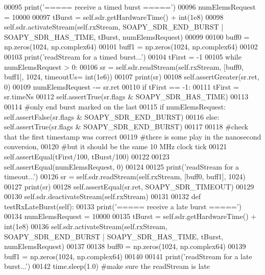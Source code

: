 \begin{DoxyCode}
{{{00095         print(\textcolor{stringliteral}{'===== receive a timed burst ====='})
00096         numElemsRequest = 10000
00097         tBurst = self.sdr.getHardwareTime() + int(1e8)
00098         self.sdr.activateStream(self.rxStream, SOAPY\_SDR\_END\_BURST | SOAPY\_SDR\_HAS\_TIME, tBurst, 
      numElemsRequest)
00099 
00100         buff0 = np.zeros(1024, np.complex64)
00101         buff1 = np.zeros(1024, np.complex64)
00102 
00103         print(\textcolor{stringliteral}{'readStream for a timed burst...'})
00104         tFirst = -1
00105         \textcolor{keywordflow}{while} numElemsRequest > 0:
00106             sr = self.sdr.readStream(self.rxStream, [buff0, buff1], 1024, timeoutUs=
      int(1e6))
00107             print(sr)
00108             self.assertGreater(sr.ret, 0)
00109             numElemsRequest -= sr.ret
00110             \textcolor{keywordflow}{if} tFirst == -1:
00111                 tFirst = sr.timeNs
00112                 self.assertTrue(sr.flags & SOAPY\_SDR\_HAS\_TIME)
00113 
00114             \textcolor{comment}{#only end burst marked on the last}
00115             \textcolor{keywordflow}{if} numElemsRequest: self.assertFalse(sr.flags & SOAPY\_SDR\_END\_BURST)
00116             \textcolor{keywordflow}{else}: self.assertTrue(sr.flags & SOAPY\_SDR\_END\_BURST)
00117 
00118         \textcolor{comment}{#check that the first timestamp was correct}
00119         \textcolor{comment}{#there is some play in the nanosecond conversion,}
00120         \textcolor{comment}{#but it should be the same 10 MHz clock tick}
00121         self.assertEqual(tFirst/100, tBurst/100)
00122 
00123         self.assertEqual(numElemsRequest, 0)
00124 
00125         print(\textcolor{stringliteral}{'readStream for a timeout...'})
00126         sr = self.sdr.readStream(self.rxStream, [buff0, buff1], 1024)
00127         print(sr)
00128         self.assertEqual(sr.ret, SOAPY\_SDR\_TIMEOUT)
00129 
00130         self.sdr.deactivateStream(self.rxStream)
00131 
00132     \textcolor{keyword}{def }testRxLateBurst(self):
00133         print(\textcolor{stringliteral}{'===== receive a late burst ====='})
00134         numElemsRequest = 10000
00135         tBurst = self.sdr.getHardwareTime() + int(1e8)
00136         self.sdr.activateStream(self.rxStream, SOAPY\_SDR\_END\_BURST | SOAPY\_SDR\_HAS\_TIME, tBurst, 
      numElemsRequest)
00137 
00138         buff0 = np.zeros(1024, np.complex64)
00139         buff1 = np.zeros(1024, np.complex64)
00140 
00141         print(\textcolor{stringliteral}{'readStream for a late burst...'})
00142         time.sleep(1.0) \textcolor{comment}{#make sure the readStream is late}
}}}
\end{DoxyCode}

